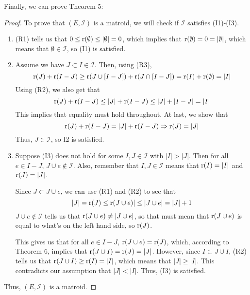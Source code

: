 Finally, we can prove Theorem 5:
\begin{proof}
    To prove that $(E,\mathcal{I})$ is a matroid, we will check if $\mathcal{I}$ satisfies (I1)-(I3).
    \begin{enumerate}
        \item (R1) tells us that $0\leq\text{r}(\emptyset)\leq|\emptyset|=0$, which implies that $\text{r}(\emptyset)=0=|\emptyset|$, which means that $\emptyset\in\mathcal{I}$, so (I1) is satisfied.
        \item Assume we have $J\subset I\in\mathcal{I}$. Then, using (R3),
        $$ \text{r}(J)+\text{r}(I-J) \geq \text{r}(J\cup[I-J])+\text{r}(J\cap[I-J]) = \text{r}(I)+\text{r}(\emptyset)=|I| $$
        Using (R2), we also get that
        $$ \text{r}(J)+\text{r}(I-J) \leq |J|+\text{r}(I-J) \leq |J|+|I-J| = |I| $$
        This implies that equality must hold throughout. At last, we show that
        $$ \text{r}(J)+\text{r}(I-J) = |J|+\text{r}(I-J) \Rightarrow \text{r}(J)=|J| $$
        Thus, $J\in\mathcal{I}$, so {I2} is satisfied.
        
        \item Suppose (I3) does not hold for some $I,J\in\mathcal{I}$ with $|I|>|J|$. Then for all $e\in I-J$, $J\cup e\notin \mathcal{I}$. Also, remember that $I,J\in\mathcal{I}$ means that $\text{r}(I)=|I|$ and $\text{r}(J)=|J|$.

        Since $J\subset J\cup e$, we can use (R1) and (R2) to see that
        $$ |J|=\text{r}(J)\leq\text{r}(J\cup e)|\leq|J\cup e|=|J|+1 $$
        $J\cup e\notin \mathcal{I}$ tells us that $\text{r}(J\cup e)\neq|J\cup e|$, so that must mean that $\text{r}(J\cup e)$ is equal to what's on the left hand side, so $\text{r}(J)$.

        This gives us that for all $e\in I-J$, $\text{r}(J\cup e)=\text{r}(J)$, which, according to Theorem 6, implies that $\text{r}(J\cup I)=\text{r}(J)=|J|$. However, since $I\subset J\cup I$, (R2) tells us that $\text{r}(J\cup I) \geq \text{r}(I) = |I|$, which means that $|J|\geq|I|$. This contradicts our assumption that $|J|<|I|$. Thus, (I3) is satisfied.
    \end{enumerate}
    Thus, $(E,\mathcal{I})$ is a matroid.
\end{proof}

\begin{exmp}
    
\end{exmp}



